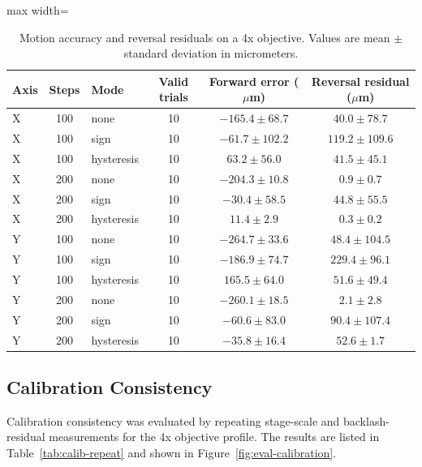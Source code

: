 \begin{table}[H]
    \centering
    \caption[4x motion accuracy and reversal residuals]{Motion accuracy and reversal residuals on a 4x objective. Values are mean $\pm$ standard deviation in micrometers.}
    \label{tab:motion}
    \begin{adjustbox}{max width=\linewidth}
    \begin{tabular}{l c l c c c}
        \toprule
        \textbf{Axis} & \textbf{Steps} & \textbf{Mode} & \textbf{Valid trials} &
        \textbf{Forward error ($\mu$m)} & \textbf{Reversal residual ($\mu$m)} \\
        \midrule
        X & 100 & none       & 10 & $-165.4 \pm 68.7$ & $40.0 \pm 78.7$ \\
        X & 100 & sign       & 10 & $-61.7 \pm 102.2$ & $119.2 \pm 109.6$ \\
        X & 100 & hysteresis & 10 & $63.2 \pm 56.0$ & $41.5 \pm 45.1$ \\
        X & 200 & none       & 10 & $-204.3 \pm 10.8$ & $0.9 \pm 0.7$ \\
        X & 200 & sign       & 10 & $-30.4 \pm 58.5$ & $44.8 \pm 55.5$ \\
        X & 200 & hysteresis & 10 & $11.4 \pm 2.9$ & $0.3 \pm 0.2$ \\
        Y & 100 & none       & 10 & $-264.7 \pm 33.6$ & $48.4 \pm 104.5$ \\
        Y & 100 & sign       & 10 & $-186.9 \pm 74.7$ & $229.4 \pm 96.1$ \\
        Y & 100 & hysteresis & 10 & $165.5 \pm 64.0$ & $51.6 \pm 49.4$ \\
        Y & 200 & none       & 10 & $-260.1 \pm 18.5$ & $2.1 \pm 2.8$ \\
        Y & 200 & sign       & 10 & $-60.6 \pm 83.0$ & $90.4 \pm 107.4$ \\
        Y & 200 & hysteresis & 10 & $-35.8 \pm 16.4$ & $52.6 \pm 1.7$ \\
        \bottomrule
    \end{tabular}
    \end{adjustbox}
\end{table}

\subsection{Calibration Consistency}

Calibration consistency was evaluated by repeating stage-scale and backlash-residual measurements for the 4x objective profile. The results are listed in Table~\ref{tab:calib-repeat} and shown in Figure~\ref{fig:eval-calibration}.

